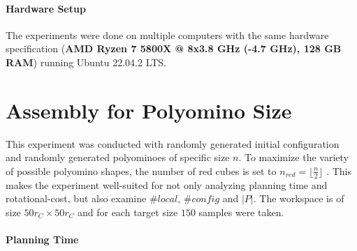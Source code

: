 \paragraph{Hardware Setup}
The experiments were done on multiple computers with the same hardware specification (\textbf{AMD Ryzen 7 5800X @ 8x3.8 GHz (-4.7 GHz), 128 GB RAM}) running Ubuntu 22.04.2 LTS.





\section{Assembly for Polyomino Size}
\label{sec:AFN}

This experiment was conducted with randomly generated initial configuration and randomly generated polyominoes of specific size $n$.
To maximize the variety of possible polyomino shapes, the number of red cubes is set to $n_\textit{red} = \lfloor \frac{n}{2} \rfloor$ \cite{Lu2021}.
This makes the experiment well-suited for not only analyzing planning time and rotational-cost, but also examine $\#\textit{local}$, $\#\textit{config}$ and $|P|$.
The workspace is of size $50 r_C \times 50 r_C$ and for each target size $150$ samples were taken.

\paragraph{Planning Time}

